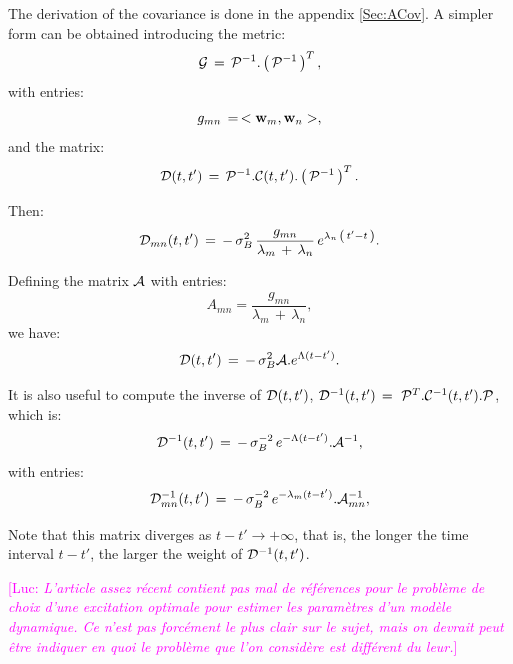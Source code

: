 \documentclass{article}
\newcommand{\Luc}[1]{{\textcolor{magenta}{[Luc: \textit{#1}]}}}
\begin{document}
The derivation of the covariance is done in the appendix \ref{Sec:ACov}.
A simpler form can be obtained introducing the metric:
%
\begin{equation}\label{eq:Metric}
{\mathcal G}\,=\,{\mathcal P}^{-1}.\left(\, {\mathcal P}^{-1} \, \right)^T,
\end{equation}
%
with entries:
\begin{equation}\label{eq:gij}
g_{mn}\,=\,<\bold{w}_m,\bold{w}_n>,
\end{equation}
%
and the matrix:
%
\begin{equation}\label{eq:Delta}
{\mathcal D}(t,t')\,=\,{\mathcal P}^{-1}.{\mathcal C}(t,t').\left(\, {\mathcal P}^{-1} \, \right)^T.
\end{equation}

Then:
%
\begin{equation}\label{eq:Deltamn}
{\mathcal D}_{mn}(t,t') \,=\,  
- \, \sigma_B^2 \, \frac{g_{mn}}{\lambda_m \,+\, \lambda_n} \, e^{\lambda_n \, \left(\, t'-t \, \right)}.
\end{equation}

Defining the matrix ${\mathcal A}$ with entries:
%
\begin{equation}\label{eq:Amn}
A_{mn}=\frac{g_{mn}}{\lambda_m \,+\, \lambda_n},
\end{equation}
%
we have:
%
\begin{equation}\label{eq:D_mat}
{\mathcal D}(t,t') \,=\,- \, \sigma_B^2 {\mathcal A}.e^{\Lambda(t-t')}.
\end{equation}

It is also useful to compute the inverse of ${\mathcal D}(t,t')$, $\cD^{-1}(t,t')\,=\ \cP^T.\cC^{-1}(t,t').\cP$, which is:
%
\begin{equation}\label{eq:Dmoins1}
{\mathcal D}^{-1}(t,t') \,=\, - \, \sigma_B^{-2} \, e^{-\Lambda(t-t')}.{\mathcal A}^{-1},
\end{equation} 
%
with entries:
%
\begin{equation}\label{eq:Dmoins1}
{\mathcal D}^{-1}_{mn}(t,t') \,=\, - \, \sigma_B^{-2} \, e^{-\lambda_m(t-t')}.{\mathcal A}^{-1}_{mn},
\end{equation} 

Note that this matrix diverges as $t-t' \to +\infty$, that is, the longer the time interval $t-t'$, the larger the weight of ${\mathcal D}^{-1}(t,t')$.

\Luc{L'article assez récent \cite{duarte2021optimal} contient pas mal de références pour le problème de choix d'une excitation optimale  pour estimer les paramètres d'un modèle dynamique. Ce n'est pas forcément le plus clair sur le sujet, mais on devrait peut être indiquer en quoi le problème que l'on considère est différent du leur.}
\end{document}
